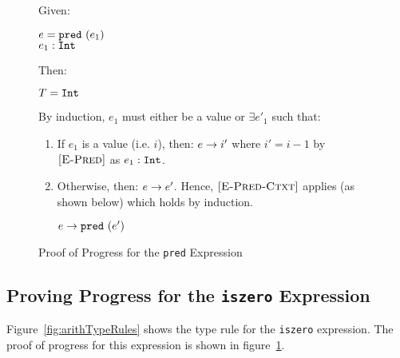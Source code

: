 \documentclass{report}
\newcommand{\rel}[1]{ \mbox{\sc [#1]} }
\begin{document}
\begin{figure}[ht!]
Given:
\begin{center}
  $e = \mbox{\tt pred}~(e_1)$ \\
  ${e_1} : {\mbox{\tt Int}}$
\end{center}
Then:~\\
\begin{center}
   $T = \mbox{\tt Int}$
\end{center}

By induction, $e_1$ must either be a value or $\exists e'_1$ such that:~\\

	\begin{enumerate}
    \item If $e_1$ is a value (i.e. $i$), then: ${e} \rightarrow {i'}$ where $i' = i - 1$ by $\rel{E-Pred}$ as ${e_1} : {\mbox{\tt Int}}$.
      
    \item Otherwise, then: ${e} \rightarrow {e'}$.  Hence, $\rel{E-Pred-Ctxt}$ applies (as shown below) which holds by induction.
    
    \begin{center}
      ${e} \rightarrow {\mbox{\tt pred}~(e')}$
    \end{center}
	
	\end{enumerate}
	
  \caption{Proof of Progress for the \texttt{pred} Expression}\label{fig:predProofProgress}
\end{figure}

\subsection{Proving Progress for the \texttt{iszero} Expression}

Figure~\ref{fig:arithTypeRules} shows the type rule for the \texttt{iszero} expression.  The proof of progress for this expression is shown in figure~\ref{fig:predProofProgress}.
\end{document}
